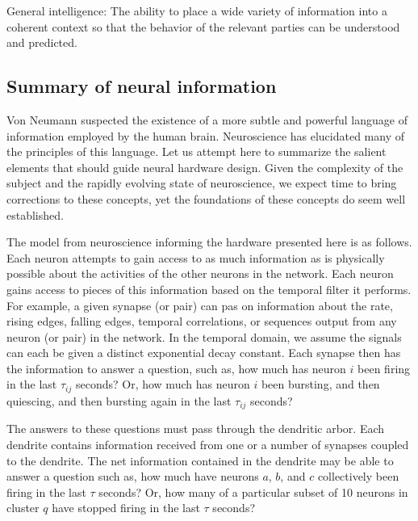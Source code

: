 \documentclass[twocolumn]{article}
\begin{document}
General intelligence: The ability to place a wide variety of information into a coherent context so that the behavior of the relevant parties can be understood and predicted.

\subsection{Summary of neural information}
Von Neumann suspected the existence of a more subtle and powerful language of information employed by the human brain. Neuroscience has elucidated many of the principles of this language. Let us attempt here to summarize the salient elements that should guide neural hardware design. Given the complexity of the subject and the rapidly evolving state of neuroscience, we expect time to bring corrections to these concepts, yet the foundations of these concepts do seem well established.

The model from neuroscience informing the hardware presented here is as follows. Each neuron attempts to gain access to as much information as is physically possible about the activities of the other neurons in the network. Each neuron gains access to pieces of this information based on the temporal filter it performs. For example, a given synapse (or pair) can pas on information about the rate, rising edges, falling edges, temporal correlations, or sequences output from any neuron (or pair) in the network. In the temporal domain, we assume the signals can each be given a distinct exponential decay constant. Each synapse then has the information to answer a question, such as, how much has neuron $i$ been firing in the last $\tau_{ij}$ seconds? Or, how much has neuron $i$ been bursting, and then quiescing, and then bursting again in the last $\tau_{ij}$ seconds? 

The answers to these questions must pass through the dendritic arbor. Each dendrite contains information received from one or a number of synapses coupled to the dendrite. The net information contained in the dendrite may be able to answer a question such as, how much have neurons $a$, $b$, and $c$ collectively been firing in the last $\tau$ seconds? Or, how many of a particular subset of 10 neurons in cluster $q$ have stopped firing in the last $\tau$ seconds? 
\end{document}
